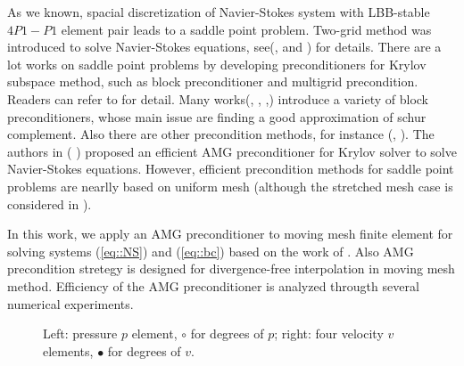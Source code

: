 \documentclass{eajam}
\begin{document}
    As we known, spacial discretization of Navier-Stokes system with
    LBB-stable $4P1-P1$ element pair leads to a saddle point problem.
    Two-grid method was introduced to solve Navier-Stokes equations,
    see(\cite{shen1999schur},\cite{xu1992iterative} and
    \cite{he2003two}) for details. There are a lot works on saddle
    point problems by developing preconditioners for Krylov subspace
    method, such as block preconditioner and multigrid
    precondition. Readers can refer to \cite{benzi2005numerical} for
    detail. Many works(\cite{bai2005inexact}, \cite{bai2006structured},
    \cite{elman2007least},\cite{elman2009boundary}) introduce a
    variety of block preconditioners, whose main issue are finding a
    good approximation of schur complement. Also there are other
    precondition methods, for instance (\cite{benzi2006augmented},
    \cite{benzi2011relaxed}). The authors in (\cite{boyle2007hsl}
    \cite{boyle2010hsl_mi20}) proposed an efficient AMG preconditioner
    for Krylov solver to solve Navier-Stokes equations. However,
    efficient precondition methods for saddle point problems are nearlly
    based on uniform mesh (although the stretched mesh case is considered
    in \cite{benzi2011relaxed}).
    
    In this work, we apply an AMG preconditioner to moving mesh
    finite element for solving systems (\ref{eq::NS}) and
    (\ref{eq::bc}) based on the work of \cite{elman2005finite}. Also
    AMG precondition stretegy is designed for divergence-free
    interpolation in moving mesh method. Efficiency of the AMG
    preconditioner is analyzed througth several numerical experiments.

    \begin{figure}
      \centering    
      \caption{Left: pressure $p$ element, $\circ$ for degrees of $p$; 
               right: four velocity $v$ elements, $\bullet$ for degrees
               of $v$.}
      \label{fig::p-v}       
    \end{figure}
      
\end{document}
